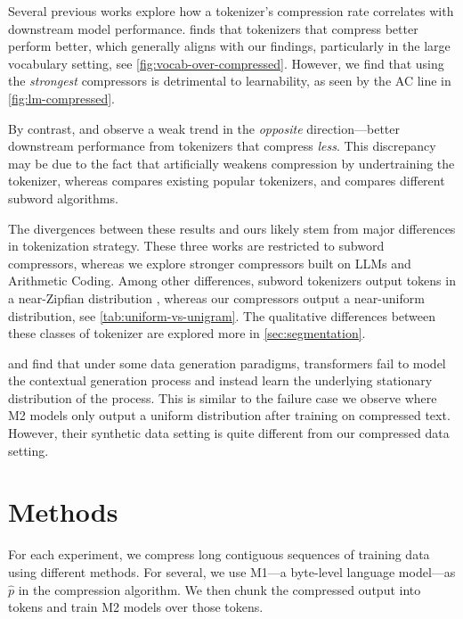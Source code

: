Several previous works explore how a tokenizer's compression rate correlates with downstream model performance.  \citet{goldmanUnpackingTokenizationEvaluating2024} finds that tokenizers that compress better perform better, which generally aligns with our findings, particularly in the large vocabulary setting, see \ref{fig:vocab-over-compressed}. However, we find that using the \emph{strongest} compressors is detrimental to learnability, as seen by the AC line in \ref{fig:lm-compressed}.

By contrast, \citet{schmidt2024tokenizationcompression} and \citet{daganGettingMostTokenizer2024} observe a weak trend in the \emph{opposite} direction---better downstream performance from tokenizers that compress \emph{less}. This discrepancy may be due to the fact that \citet{goldmanUnpackingTokenizationEvaluating2024} artificially weakens compression by undertraining the tokenizer, whereas \citet{daganGettingMostTokenizer2024} compares existing popular tokenizers, and \citet{schmidt2024tokenizationcompression} compares different subword algorithms.

The divergences between these results and ours likely stem from major differences in tokenization strategy. These three works are restricted to subword compressors, whereas we explore stronger compressors built on LLMs and Arithmetic Coding. Among other differences, subword tokenizers output tokens in a near-Zipfian distribution \cite{Zipf:1935kj}, whereas our compressors output a near-uniform distribution, see \ref{tab:uniform-vs-unigram}. The qualitative differences between these classes of tokenizer are explored more in \ref{sec:segmentation}.

\citet{rajaramanTowardTheoryTokenization2024} and \citet{makkuvaAttentionMarkov2024} find that under some data generation paradigms, transformers fail to model the contextual generation process and instead learn the underlying stationary distribution of the process. This is similar to the failure case we observe where M2 models only output a uniform distribution after training on compressed text. However, their synthetic data setting is quite different from our compressed data setting.

\section{Methods}
\label{sec:methods}

For each experiment, we compress long contiguous sequences of training data using different methods. For several, we use M1---a byte-level language model---as $\hat{p}$ in the compression algorithm. We then chunk the compressed output into tokens and train M2 models over those tokens.


